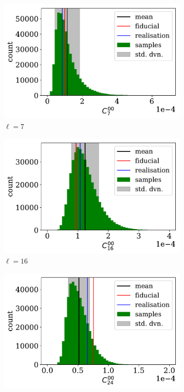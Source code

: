 \begin{figure}
\begin{subfigure}{.5\textwidth}
  \centering
  \includegraphics[width=\textwidth]{BPL-FIGS/Euclid-LN-PNoi-N32-HDens_HISTOGRAM-ell-07.pdf}
  \caption{$\ell = 7$}
\end{subfigure}
\begin{subfigure}{.5\textwidth}
  \centering
  \includegraphics[width=\textwidth]{BPL-FIGS/Euclid-LN-PNoi-N32-HDens_HISTOGRAM-ell-16.pdf}
  \caption{$\ell = 16$}
\end{subfigure}
\begin{subfigure}{.5\textwidth}
  \centering
  \includegraphics[width=\textwidth]{BPL-FIGS/Euclid-LN-PNoi-N32-HDens_HISTOGRAM-ell-24.pdf}

\end{subfigure}
\end{figure}
